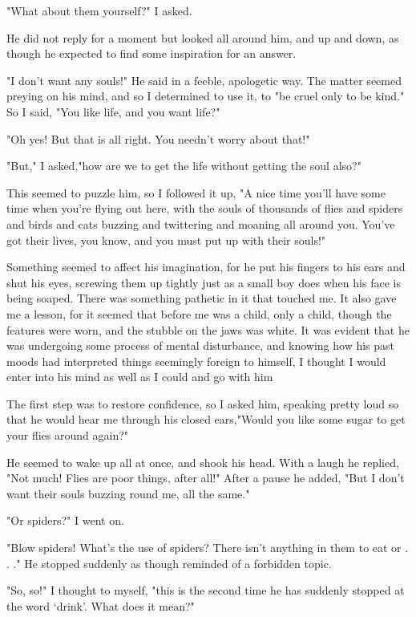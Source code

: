 "What about them yourself?" I asked. 

He did not reply for a moment but looked all around him, and up and down, as though he expected to find some inspiration for an answer. 

"I don't want any souls!" He said in a feeble, apologetic way. The matter seemed preying on his mind, and so I determined to use it, to "be cruel only to be kind." So I said, "You like life, and you want life?" 

"Oh yes! But that is all right. You needn't worry about that!" 

"But," I asked,"how are we to get the life without getting the soul also?" 

This seemed to puzzle him, so I followed it up, "A nice time you'll have some time when you're flying out here, with the souls of thousands of flies and spiders and birds and cats buzzing and twittering and moaning all around you. You've got their lives, you know, and you must put up with their souls!" 

Something seemed to affect his imagination, for he put his fingers to his ears and shut his eyes, screwing them up tightly just as a small boy does when his face is being soaped. There was something pathetic in it that touched me. It also gave me a lesson, for it seemed that before me was a child, only a child, though the features were worn, and the stubble on the jaws was white. It was evident that he was undergoing some process of mental disturbance, and knowing how his past moods had interpreted things seemingly foreign to himself, I thought I would enter into his mind as well as I could and go with him 

The first step was to restore confidence, so I asked him, speaking pretty loud so that he would hear me through his closed ears,"Would you like some sugar to get your flies around again?" 

He seemed to wake up all at once, and shook his head. With a laugh he replied, "Not much! Flies are poor things, after all!" After a pause he added, "But I don't want their souls buzzing round me, all the same." 

"Or spiders?" I went on. 

"Blow spiders! What's the use of spiders? There isn't anything in them to eat or . . ." He stopped suddenly as though reminded of a forbidden topic. 

"So, so!" I thought to myself, "this is the second time he has suddenly stopped at the word `drink'. What does it mean?" 

